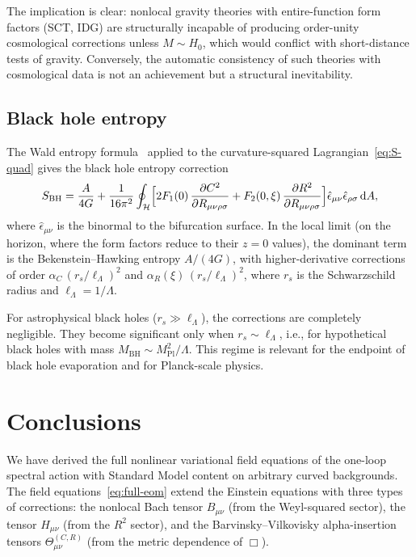 \documentclass[12pt,a4paper]{article}
\newcommand{\dd}{\mathrm{d}}
\newcommand{\Lam}{\Lambda}
\theoremstyle{plain}
\theoremstyle{definition}
\begin{document}
The implication is clear: nonlocal gravity theories with entire-function form factors (SCT, IDG)
are structurally incapable of producing order-unity cosmological corrections
unless $M \sim H_0$, which would conflict with short-distance tests of
gravity.  Conversely, the automatic consistency of such theories with
cosmological data is not an achievement but a structural inevitability.

\subsection{Black hole entropy}

The Wald entropy formula~\cite{Wald:1993nt} applied to the curvature-squared
Lagrangian~\eqref{eq:S-quad} gives the black hole entropy correction
\begin{equation}\label{eq:wald-entropy}
  S_{\mathrm{BH}} = \frac{A}{4G}
  + \frac{1}{16\pi^2}\oint_{\mathcal{H}}
  \Bigl[2F_1(0)\,\frac{\partial C^2}{\partial R_{\mu\nu\rho\sigma}}
  + F_2(0,\xi)\,\frac{\partial R^2}
  {\partial R_{\mu\nu\rho\sigma}}\Bigr]
  \hat{\epsilon}_{\mu\nu}\hat{\epsilon}_{\rho\sigma}\,\dd A,
\end{equation}
where $\hat{\epsilon}_{\mu\nu}$ is the binormal to the bifurcation surface.
In the local limit (on the horizon, where the form factors reduce to their
$z = 0$ values), the dominant term is the Bekenstein--Hawking entropy
$A/(4G)$, with higher-derivative corrections of order
$\alpha_C\,(r_s/\ell_\Lam)^2$ and $\alpha_R(\xi)\,(r_s/\ell_\Lam)^2$,
where $r_s$ is the Schwarzschild radius and $\ell_\Lam = 1/\Lam$.

For astrophysical black holes ($r_s \gg \ell_\Lam$), the corrections are
completely negligible.  They become significant only when
$r_s \sim \ell_\Lam$, i.e., for hypothetical black holes with mass
$M_{\mathrm{BH}} \sim M_{\mathrm{Pl}}^2/\Lam$.  This regime is relevant
for the endpoint of black hole evaporation and for
Planck-scale physics.

\section{Conclusions}
\label{sec:conclusions}

We have derived the full nonlinear variational field equations of the
one-loop spectral action with Standard Model content on arbitrary curved
backgrounds.  The field equations~\eqref{eq:full-eom} extend the
Einstein equations with three types of corrections: the nonlocal Bach
tensor $B_{\mu\nu}$ (from the Weyl-squared sector), the tensor
$H_{\mu\nu}$ (from the $R^2$ sector), and the Barvinsky--Vilkovisky
alpha-insertion tensors $\Theta^{(C,R)}_{\mu\nu}$ (from the metric
dependence of $\Box$).
\end{document}
